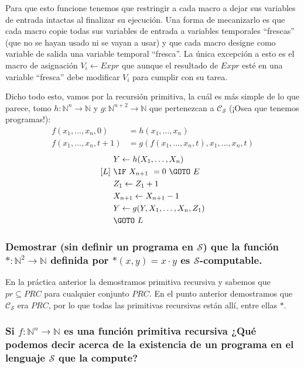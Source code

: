 \documentclass[fleqn, 11pt]{article}
\newcommand{\nat}{\mathbb{N}}
\newcommand{\Ccur}{\mathcal{C}}
\newcommand{\Scur}{\mathcal{S}}
\newcommand{\into}{\leftarrow}
\begin{document}
Para que esto funcione tenemos que restringir a cada macro a dejar sus
variables de entrada intactas al finalizar su ejecución. Una forma de
mecanizarlo es que cada macro copie todas sus variables de entrada a variables
temporales ``frescas'' (que no se hayan usado ni se vayan a usar) y que cada
macro designe como variable de salida una variable temporal ``fresca''. La
única excepción a esto es el macro de asignación $V_i \into Expr$ que aunque el
resultado de $Expr$ esté en una variable ``fresca'' debe modificar $V_i$ para
cumplir con su tarea.

Dicho todo esto, vamos por la recursión primitiva, la cuál es más simple de lo
que parece, tomo $h : \nat^n \to \nat$ y $g : \nat^{n + 2} \to \nat$ que
pertenezcan a $\Ccur_\Scur$ (¡Osea que tenemos programas!):
\begin{align*}
	f(x_1, \dots, x_n, 0)     &= h(x_1, \dots, x_n) \\
	f(x_1, \dots, x_n, t + 1) &= g(f(x_1, \dots, x_n, t),
				       x_1, \dots, x_n, t)
\end{align*}
\begin{align*}
	     &Y \into h(X_1, \dots, X_n) \\
	[L]\ &\IF\ X_{n+1}\ = 0\ \GOTO\ E \\
	     &Z_1 \into Z_1 + 1 \\
	     &X_{n+1} \into X_{n+1} - 1 \\
	     &Y \into g(Y, X_1, \dots, X_n, Z_1) \\
	     &\GOTO\ L
\end{align*}

\subsubsection{Demostrar (sin definir un programa en $\Scur$) que la función
$* : \nat^2 \to \nat$ definida por $*(x, y) = x \cdot y$ es
$\Scur$-computable.}

En la práctica anterior la demostramos primitiva recursiva y sabemos que
$pr \subseteq PRC$ para cualquier conjunto $PRC$. En el punto anterior
demostramos que $\Ccur_\Scur$ era $PRC$, por lo que todas las primitivas
recursivas están allí, entre ellas $*$.

\subsubsection{Si $f : \nat^n \to \nat$ es una función primitiva recursiva ¿Qué
podemos decir acerca de la existencia de un programa en el lenguaje $\Scur$ que
la compute?}
\end{document}
